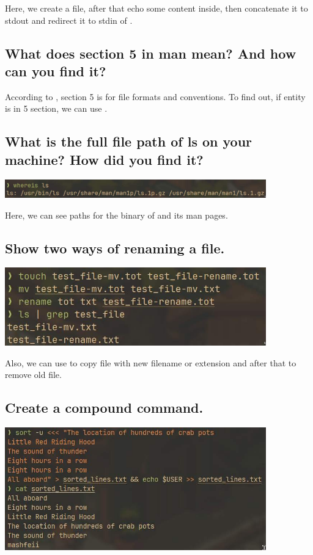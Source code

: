 \documentclass{article}
\begin{document}
Here, we create a file, after that echo some content inside, then concatenate it to stdout and redirect it to stdin of .

\subsection{What does section 5 in man mean? And how can you find it?}
\noindent

According to , section 5 is for file formats and conventions.
To find out, if entity is in 5 section, we can use .

\subsection{What is the full file path of ls on your machine? How did you find it?}
\noindent

\includegraphics[width=320pt]{ls.jpg}

Here, we can see paths for the binary of  and its man pages.

\subsection{Show two ways of renaming a file.}
\noindent

\includegraphics[width=320pt]{rename.jpg}

Also, we can use  to copy file with new filename or extension and after that  to remove old file.

\subsection{Create a compound command.}
\noindent

\includegraphics[width=320pt]{sort.jpg}
\end{document}
